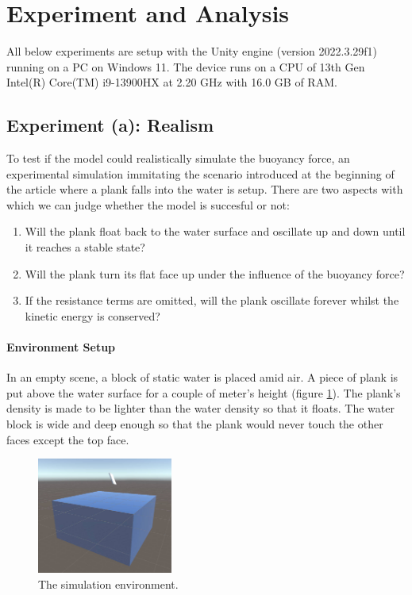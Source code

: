\section{Experiment and Analysis}

All below experiments are setup with the Unity engine (version 2022.3.29f1) running on a PC on Windows 11.
The device runs on a CPU of 13th Gen Intel(R) Core(TM) i9-13900HX at 2.20 GHz with 16.0 GB of RAM.

\subsection{Experiment (a): Realism}

To test if the model could realistically simulate the buoyancy force, an experimental simulation immitating the scenario introduced at the beginning of the article where a plank falls into the water is setup.
There are two aspects with which we can judge whether the model is succesful or not:
\begin{enumerate}
	\item Will the plank float back to the water surface and oscillate up and down until it reaches a stable state?
	\item Will the plank turn its flat face up under the influence of the buoyancy force?
	\item If the resistance terms are omitted, will the plank oscillate forever whilst the kinetic energy is conserved?
\end{enumerate}

\paragraph*{Environment Setup}

In an empty scene, a block of static water is placed amid air.
A piece of plank is put above the water surface for a couple of meter's height (figure \ref{simulation-environment}).
The plank's density is made to be lighter than the water density so that it floats.
The water block is wide and deep enough so that the plank would never touch the other faces except the top face.

\begin{figure}[h]
	\centering
	\includegraphics[height=1.5in]{figures/experiment-environment.jpg}
	\caption{The simulation environment.}
	\label{simulation-environment}
\end{figure}

